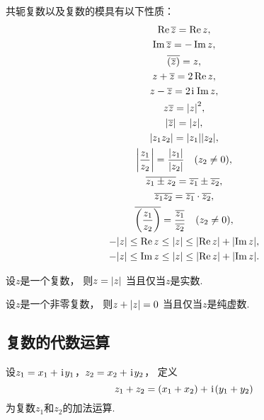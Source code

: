 \begin{property}
共轭复数以及复数的模具有以下性质：\begin{gather}
	\Re \overline{z} = \Re z, \\
	\Im \overline{z} = -\Im z, \\
	\overline{(\overline{z})} = z, \\
	z+\overline{z} = 2 \Re z, \\
	z-\overline{z} = 2\kern1pt\mathrm{i}\kern1pt \Im z, \\
	z\overline{z} = \abs{z}^2, \\
	\abs{\overline{z}}=\abs{z}, \\
	\abs{z_1 z_2} = \abs{z_1} \abs{z_2}, \\
	\abs{\frac{z_1}{z_2}} = \frac{\abs{z_1}}{\abs{z_2}} \quad(z_2 \neq 0), \\
	\overline{z_1 \pm z_2} = \overline{z_1} \pm \overline{z_2}, \\
	\overline{z_1 z_2} = \overline{z_1} \cdot \overline{z_2}, \\
	\overline{\left(\frac{z_1}{z_2}\right)} = \frac{\overline{z_1}}{\overline{z_2}} \quad (z_2 \neq 0), \\
	-\abs{z} \leq \Re z \leq \abs{z} \leq \abs{\Re z} + \abs{\Im z}, \\
	-\abs{z} \leq \Im z \leq \abs{z} \leq \abs{\Re z} + \abs{\Im z}.
\end{gather}
\end{property}

\begin{property}
设\(z\)是一个复数，
则\(z = \abs{z}\)
当且仅当\(z\)是实数.
\end{property}

\begin{property}
设\(z\)是一个非零复数，
则\(z + \abs{z} = 0\)
当且仅当\(z\)是纯虚数.
\end{property}

\subsection{复数的代数运算}
\begin{definition}%
设\(z_1=x_1+\kern1pt\mathrm{i}\kern1pt y_1\)，\(z_2=x_2+\kern1pt\mathrm{i}\kern1pt y_2\)，
定义\begin{equation*}
	z_1+z_2=(x_1+x_2)+\kern1pt\mathrm{i}\kern1pt(y_1+y_2)
\end{equation*}为复数\(z_1\)和\(z_2\)的加法运算.
\end{definition}

